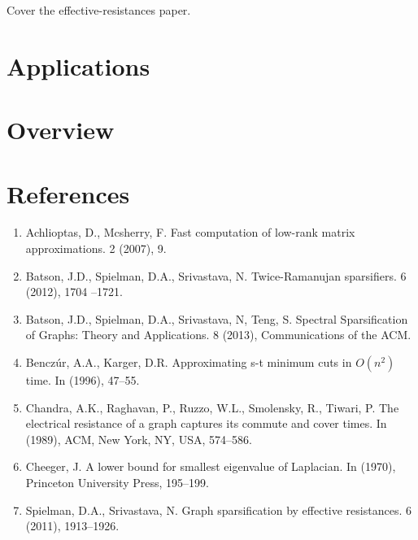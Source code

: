 \documentclass{article}
\begin{document}
Cover the effective-resistances paper.

\section{Applications}

\section{Overview}

\section*{References}

\begin{enumerate}[1.]
    \item Achlioptas, D., Mcsherry, F. Fast computation of low-rank matrix
        approximations. 2 (2007), 9.

    \item Batson, J.D., Spielman, D.A., Srivastava, N.  Twice-Ramanujan
        sparsifiers. 6 (2012), 1704 –1721.

    \item Batson, J.D., Spielman, D.A., Srivastava, N, Teng, S.  Spectral
        Sparsification of Graphs: Theory and Applications. 8 (2013),
        Communications of the ACM.

    \item Bencz\'{u}r, A.A., Karger, D.R.  Approximating s-t minimum cuts in
        $O(n^2)$ time. In (1996), 47–55.

    \item Chandra, A.K., Raghavan, P., Ruzzo, W.L., Smolensky, R., Tiwari,
        P.  The electrical resistance of a graph captures its commute and
        cover times. In (1989), ACM, New York, NY, USA, 574–586.

    \item Cheeger, J. A lower bound for smallest eigenvalue of Laplacian. In
        (1970), Princeton University Press, 195–199.

    \item Spielman, D.A., Srivastava, N. Graph sparsification by effective
        resistances.  6 (2011), 1913–1926.
\end{enumerate}
\end{document}
